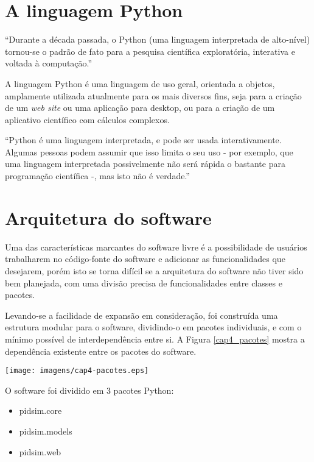 \section{A linguagem Python}

    ``Durante a década passada, o Python (uma linguagem interpretada
    de alto-nível) tornou-se o padrão de fato para a pesquisa científica
    exploratória, interativa e voltada à computação.'' \cite{5725235}
    
    A linguagem Python \cite{Python} é uma linguagem de uso geral, orientada a objetos,
    amplamente utilizada atualmente para os mais diversos fins, seja para a criação de um
    \textit{web site} ou uma aplicação para desktop, ou para a criação de um aplicativo
    científico com cálculos complexos.
    
    ``Python é uma linguagem interpretada, e pode ser usada interativamente.
    Algumas pessoas podem assumir que isso limita o seu uso - por exemplo,
    que uma linguagem interpretada possivelmente não será rápida o bastante
    para programação científica -, mas isto não é verdade.'' \cite{4160249}

\section{Arquitetura do software}

    Uma das características marcantes do software livre é a possibilidade de
    usuários trabalharem no código-fonte do software e adicionar as funcionalidades
    que desejarem, porém isto se torna difícil se a arquitetura do software não tiver
    sido bem planejada, com uma divisão precisa de funcionalidades entre classes e
    pacotes.

    Levando-se a facilidade de expansão em consideração, foi construída uma estrutura
    modular para o software, dividindo-o em pacotes individuais, e com o mínimo
    possível de interdependência entre si. A Figura \ref{cap4_pacotes} mostra a
    dependência existente entre os pacotes do software.
    
    \begin{center}
        \texttt{[image: imagens/cap4-pacotes.eps]}
	\label{cap4_pacotes}
    \end{center}
    
    O software foi dividido em 3 pacotes Python:

    \begin{itemize}
        \item pidsim.core
        \item pidsim.models
        \item pidsim.web
    \end{itemize}


